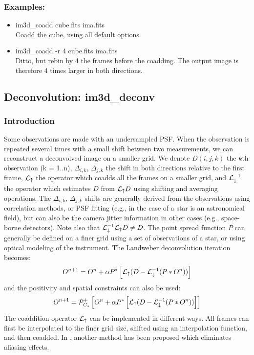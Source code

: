 \subsubsection*{Examples:}
\begin{itemize}
\baselineskip=0.4truecm
\itemsep=0.1truecm
\item im3d\_coadd cube.fits ima.fits \\
Coadd the cube, using all default options.
\item im3d\_coadd -r 4 cube.fits ima.fits \\
Ditto, but rebin by 4 the frames before the coadding. The output image
is therefore 4 times larger in both directions.
\end{itemize}


\subsection{Deconvolution: im3d\_deconv}
\subsubsection{Introduction}
Some observations are made with an undersampled PSF. When the observation
is repeated several times with a small shift between two measurements, 
we can reconstruct a deconvolved image on a smaller grid. We denote
$D(i,j,k)$ the $k$th observation (k = 1..n), 
$\Delta_{i,k}$, $\Delta_{j,k}$ the shift in both directions 
relative to the first frame, ${\cal L}_{\uparrow}$ the operator
which coadds all the frames on a smaller grid, 
and ${\cal L}^{-1}_{\downarrow}$ the
operator which estimates $D$ from 
${\cal L}_{\uparrow} D$ using shifting and averaging operations. 
The $\Delta_{i,k}$, $\Delta_{j,k}$ shifts are generally derived from the
observations using correlation methods, or PSF fitting (e.g., in the case
of  a star is an astronomical field), 
but can also be the camera jitter information in other cases (e.g., 
space-borne detectors).  
Note also that ${\cal L}^{-1}_{\downarrow} {\cal L}_{\uparrow} D \ne D$.
The point spread function $P$ can generally be defined on a finer grid using
a set of observations of a star, or using optical modeling of the instrument.
The Landweber deconvolution iteration becomes:
\begin{eqnarray}
O^{n+1} =  O^{n} + \alpha P^*\left[  {\cal L}_{\uparrow} (D - {\cal L}^{-1}_{\downarrow}(P*O^n)) \right] 
\end{eqnarray}
and the positivity and spatial constraints can also be used:
\begin{eqnarray}
O^{n+1} =  {\cal P}^+_{C_s} \left[  O^{n} + \alpha P^*\left[  {\cal L}_{\uparrow} (D - {\cal L}^{-1}_{\downarrow}(P*O^n)) \right] \right]
\end{eqnarray}
The coaddition operator ${\cal L}_{\uparrow}$ can be implemented in different 
ways. All frames can first be interpolated to the finer grid size,
shifted using an interpolation function, and then coadded. 
In \cite{rest:lauer99}, another method has been proposed which eliminates
aliasing effects.

